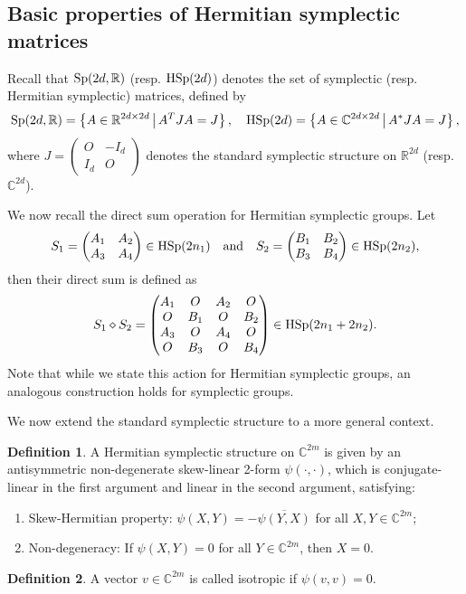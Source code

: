 \documentclass[11pt]{amsart}
\theoremstyle{remark}
\theoremstyle{definition}
\newtheorem{definition}{Definition}
\newcommand{\C}{{\mathbf C}}
\newcommand{\Sp}{{\rm Sp}}
\newcommand{\HSp}{{\rm HSp}}
\def \C{{\mathcal{C}}}
\def\C{{\mathbb C}}
\begin{document}
\subsection{Basic properties of Hermitian symplectic matrices}\label{subsec: H-S}

Recall that \( \Sp(2d,\mathbb{R}) \) (resp. \(\HSp(2d) \)) denotes the set of symplectic (resp. Hermitian symplectic) matrices, defined by
\[
\Sp(2d,\mathbb{R}) = \left\{ A \in \mathbb{R}^{2d \times 2d} \,\big|\, A^T J A = J \right\}, \quad \HSp(2d) = \left\{ A \in \mathbb{C}^{2d \times 2d} \,\big|\, A^* J A = J \right\},
\]
where \( J = \begin{pmatrix} O & -I_d \\ I_d & O \end{pmatrix} \) denotes the standard symplectic structure on \( \mathbb{R}^{2d} \) (resp. \( \mathbb{C}^{2d} \)). 

We now recall the direct sum operation for Hermitian symplectic groups. Let
\[
S_1 = \begin{pmatrix} A_1 & A_2 \\ A_3 & A_4 \end{pmatrix} \in \HSp(2n_1) \quad \text{and} \quad S_2 = \begin{pmatrix} B_1 & B_2 \\ B_3 & B_4 \end{pmatrix} \in \HSp(2n_2),
\]
then their direct sum is defined as
\[
S_1 \diamond S_2 = \begin{pmatrix}
A_1 & O & A_2 & O \\
O & B_1 & O & B_2 \\
A_3 & O & A_4 & O \\
O & B_3 & O & B_4
\end{pmatrix} \in \HSp(2n_1 + 2n_2).
\]
Note that while we state this action for Hermitian symplectic groups, an analogous construction holds for symplectic groups.

We now extend the standard symplectic structure to a more general context.

\begin{definition}
A Hermitian symplectic structure on \( \mathbb{C}^{2m} \) is given by an antisymmetric non-degenerate skew-linear 2-form \( \psi(\cdot, \cdot) \), which is conjugate-linear in the first argument and linear in the second argument, satisfying:
\begin{enumerate}
\item Skew-Hermitian property: \( \psi(X, Y) = -\overline{\psi(Y, X)} \) for all \( X, Y \in \mathbb{C}^{2m} \);
\item Non-degeneracy: If \( \psi(X, Y) = 0 \) for all \( Y \in \mathbb{C}^{2m} \), then \( X = 0 \).
\end{enumerate}
\end{definition}
\begin{definition}
    A vector $v\in \C^{2m}$ is called isotropic if $\psi(v,v)=0$.
\end{definition}
\end{document}
